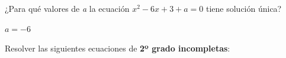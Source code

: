 \documentclass[spanish, 12pt]{exam}
\begin{document}
\begin{questions}
\begin{multicols}{3}
\end{multicols}

\question ¿Para qué valores de \emph{a} la ecuación $x^2-6x+3+a=0$ tiene solución única? 
\begin{solution} $a=-6 $\end{solution}

\question Resolver las siguientes ecuaciones de \textbf{2º grado incompletas}:
\begin{multicols}{4}
\end{multicols}
\end{questions}
\end{document}
